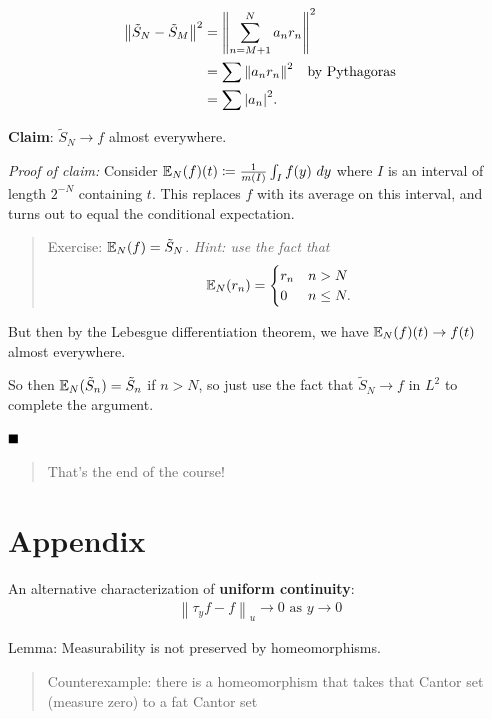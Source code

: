 \begin{align*}
{\left\lVert {\tilde S_N - \tilde S_M} \right\rVert}^2
&={\left\lVert {\sum_{n=M+1}^N a_n r_n} \right\rVert}^2 \\
&= \sum {\left\lVert {a_n r_n} \right\rVert}^2 \quad \text{by Pythagoras} \\
&= \sum {\left\lvert {a_n} \right\rvert}^2
.\end{align*}

\textbf{Claim}: \(\tilde S_N \to f\) almost everywhere.

\emph{Proof of claim:} Consider
\(\Bbb{E}_N(f)(t) \coloneqq \frac 1 {m(I)} \int_I f(y)~dy\) where \(I\)
is an interval of length \(2^{-N}\) containing \(t\). This replaces
\(f\) with its average on this interval, and turns out to equal the
conditional expectation.

\begin{quote}
Exercise: \(\Bbb{E}_N(f) = \tilde S_N\). \emph{Hint: use the fact that}
\begin{align*}
\Bbb{E}_N(r_n) = \begin{cases}
r_n & n > N \\
0 & n \leq N.
\end{cases}
\end{align*}
\end{quote}

But then by the Lebesgue differentiation theorem, we have
\(\Bbb{E}_N(f)(t) \to f(t)\) almost everywhere.

So then \(\Bbb{E}_N(\tilde S_n) = \tilde S_n\) if \(n > N\), so just use
the fact that \(\tilde S_N \to f\) in \(L^2\) to complete the argument.

\(\qed\)

\begin{quote}
That's the end of the course!
\end{quote}

\hypertarget{appendix}{%
\section{Appendix}\label{appendix}}

An alternative characterization of \textbf{uniform continuity}:
\begin{align*}
\left\|\tau_{y} f-f\right\|_{u} \rightarrow 0 \text { as } y \rightarrow 0
\end{align*}

Lemma: Measurability is not preserved by homeomorphisms.

\begin{quote}
Counterexample: there is a homeomorphism that takes that Cantor set
(measure zero) to a fat Cantor set
\end{quote}

